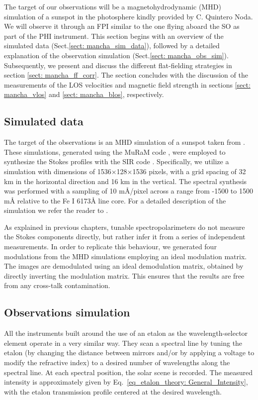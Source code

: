 The target of our observations will be a magnetohydrodynamic (MHD) simulation of a sunspot in the photosphere kindly provided by C. Quintero Noda. We will observe it through an FPI similar to the one flying aboard the SO as part of the PHI instrument. This section begins with an overview of the simulated data (Sect.\ref{sect: mancha_sim_data}), followed by a detailed explanation of the observation simulation (Sect.\ref{sect: mancha_obs_sim}). Subsequently, we present and discuss the different flat-fielding strategies in section \ref{sect: mancha_ff_corr}. The section concludes with the discussion of the measurements of the LOS velocities and magnetic field strength in sections \ref{sect: mancha_vlos} and \ref{sect: mancha_blos}, respectively.  


\subsection{\label{sect: mancha_sim_data}Simulated data}

The target of the observations is an MHD simulation of a sunspot taken from \cite{mancha-seminal}. These simulations, generated using the MuRaM code \citep{MURaM}, were employed to synthesize the Stokes profiles with the SIR code \citep{sir}.  Specifically, we utilize a simulation with dimensions of 1536×128×1536 pixels, with a grid spacing of 32 km in the horizontal direction and 16 km in the vertical. The spectral synthesis was performed with a sampling of 10 m\r{A}/pixel across a range from -1500 to 1500 m\r{A} relative to the Fe I 6173\r{A} line core. For a detailed description of the simulation we refer the reader to \cite{mancha-carlos}.

As explained in previous chapters, tunable spectropolarimeters do not measure the Stokes components directly, but rather infer it from a series of independent measurements. In order to replicate this behaviour, we generated four modulations from the MHD simulations employing an ideal modulation matrix. The images are demodulated using an ideal demodulation matrix, obtained by directly inverting the modulation matrix. This ensures that the results are free from any cross-talk contamination.
\subsection{\label{sect: mancha_obs_sim}Observations simulation}

All the instruments built around the use of an etalon as the wavelength-selector element operate in a very similar way. They scan a spectral line by tuning the etalon (by changing the distance between mirrors and/or by applying a voltage to modify the refractive index) to a desired number of wavelengths along the spectral line. At each spectral position, the solar scene is recorded. The measured intensity is approximately given by Eq.~\eqref{eq_etalon_theory: General_Intensity}, with the etalon transmission profile centered at the desired wavelength.

